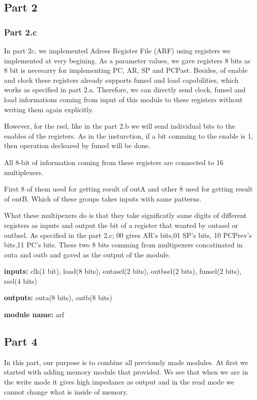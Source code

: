 \documentclass[pdftex,12pt,a4paper]{article}
\begin{document}
\subsection{Part 2}
\subsubsection{Part 2.c}
In part 2c, we implemented Adress Register File (ARF) using registers we implemented at 
very begining. As a parameter values, we gave registers 8 bits as 8 bit is necesarry for 
implementing PC, AR, SP and PCPast. Besides, of enable and clock these registers 
already supports funsel and load capabilities, which works as specified in part 2.a. 
Therefore, we can directly send clock, funsel and load informations coming from 
input of this module to these registers without writing them again explicitly.

However, for the rsel, like in the part 2.b we will send individual bits to the enables of
the registers. As in the insturction, if a bit comming to the enable is 1, then operation
decleared by funsel will be done.

All 8-bit of information coming from these registers are connected to 16 multiplexers.

First 8 of them used for getting result of outA and other 8 used for getting result of 
outB. Which of these groups takes inputs with same patterns.

What these multipexers do is that they take significatly same digits of different registers 
as inputs and output the bit of a register that wanted by outasel or outbsel. As specified
in the part 2.c; 00 gives AR's bits,01 SP's bits, 10 PCPrev's bits,11 PC's bits. 
These two 8 bits comming from multipexers concatinated in outa and outb and gaved as
the output of the module.

\textbf{inputs:}    clk(1 bit),
load(8 bits),
outasel(2 bits),
outbsel(2 bits),
funsel(2 bits),
rsel(4 bits)

\textbf{outputs:}    
outa(8 bits),
outb(8 bits)

\textbf{module name:} arf



\subsection{Part 4}
In this part, our purpose is to combine all previously made modules. 
At first we started with adding memory module that provided. We see that when 
we are in the write mode it gives high impedance as output and in the read mode
 we cannot change what is inside of memory.
\end{document}
